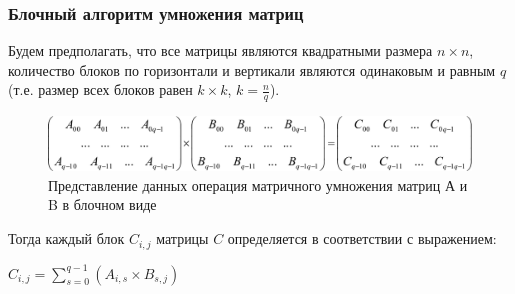 \documentclass{beamer}
\begin{document}
\begin{frame}
\frametitle{Блочный алгоритм умножения матриц}
Будем предполагать, что все матрицы являются квадратными размера $n \times n$, количество блоков по горизонтали и вертикали являются одинаковым и равным $q$ (т.е. размер всех блоков равен $k \times k$, $k=\frac{n}{q}$).

\begin{figure}
\includegraphics[scale=0.28]{res/pic011}
\caption{Представление данных операция матричного умножения матриц А и B в блочном виде}
\end{figure}

Тогда каждый блок $C_{i,j}$ матрицы $C$ определяется в соответствии с выражением:

\begin{center}
$C_{i,j} = \sum\limits^{q-1}_{s=0}(A_{i,s} \times B_{s,j})$
\end{center}

\end{frame}

\end{document}
